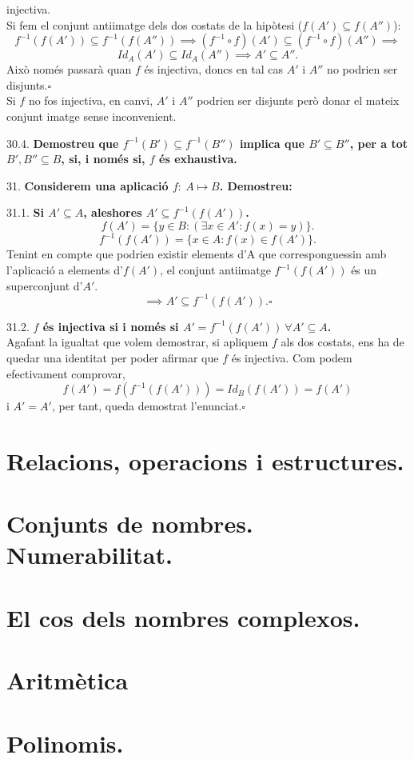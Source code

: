 \documentclass[11pt]{article}
\begin{document}
\begin{legal}[start=21]
\begin{legal}
{injectiva.}\\
		Si fem el conjunt antiimatge dels dos costats de la hipòtesi ($f(A')\subseteq f(A'')$):
		$$f^{-1}(f(A'))\subseteq f^{-1}(f(A''))\implies (f^{-1}\circ f)(A')\subseteq (f^{-1}\circ f)(A'')\implies$$
		$$Id_A(A')\subseteq Id_A(A'')\implies A'\subseteq A''.$$
		Això només passarà quan $f$ és injectiva, doncs en tal cas $A'$ i $A''$ no podrien ser disjunts.$\square$\\Si $f$ no fos injectiva, en canvi, $A'$ i $A''$ podrien ser disjunts però donar el mateix conjunt imatge sense inconvenient.
		\item[30.4.] \textbf{Demostreu que $f^{-1}(B')\subseteq f^{-1}(B'')$ implica que $B'\subseteq B''$, per a tot $B',B''\subseteq B$, si, i només si, $f$ és exhaustiva.}
	\end{legal}
	\item[31.] \textbf{Considerem una aplicació $f: \ A\mapsto B$. Demostreu:}
	\begin{legal}
		\item[31.1.] \textbf{Si $A'\subseteq A$, aleshores $A'\subseteq f^{-1}(f(A'))$.}
		$$f(A')=\{y\in B:(\exists x\in A':f(x)=y)\}.$$
		$$f^{-1}(f(A'))=\{x\in A:f(x)\in f(A')\}.$$
		Tenint en compte que podrien existir elements d'A que corresponguessin amb l'aplicació a elements d'$f(A')$, el conjunt antiimatge $f^{-1}(f(A'))$ és un superconjunt d'$A'$.
		$$\implies A'\subseteq f^{-1}(f(A')).\square$$
		\item[31.2.] \textbf{$f$ és injectiva si i només si $A'=f^{-1}(f(A')) \ \forall A'\subseteq A$.}\\
		Agafant la igualtat que volem demostrar, si apliquem $f$ als dos costats, ens ha de quedar una identitat per poder afirmar que $f$ és injectiva. Com podem efectivament comprovar,
		$$f(A')=f(f^{-1}(f(A')))=Id_B(f(A'))=f(A')$$i $A'=A'$, per tant, queda demostrat l'enunciat.$\square$
	\end{legal}
\end{legal}

\newpage

\section{Relacions, operacions i estructures.}

\newpage

\section{Conjunts de nombres. Numerabilitat.}

\newpage

\section{El cos dels nombres complexos.}

\newpage

\section{Aritmètica}

\newpage

\section{Polinomis.}
\end{document}

